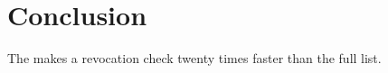 \chapter{Conclusion}

The \registry makes a revocation check twenty times faster than the full list.
